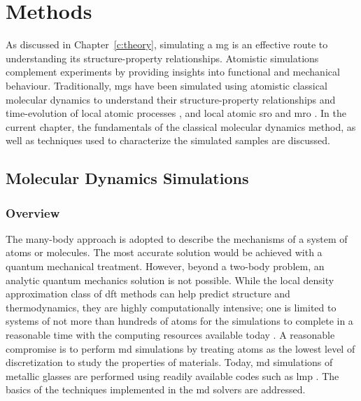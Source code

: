 \chapter{Methods} \label{c:methods}
As discussed in Chapter~\ref{c:theory}, simulating a \gls{mg} is an effective route to understanding its structure-property relationships. Atomistic simulations complement experiments by providing insights into functional and mechanical behaviour. Traditionally, \gls{mg}s have been simulated using atomistic classical molecular dynamics to understand their structure-property relationships and time-evolution of local atomic processes \cite{Schuh2007,Cheng2008}, and local atomic \gls{sro} and \gls{mro} \cite{Sheng2006}. In the current chapter, the fundamentals of the classical molecular dynamics method, as well as techniques used to characterize the simulated samples are discussed. \par

\section{Molecular Dynamics Simulations} \label{s:md}
\subsection{Overview}
The many-body approach is adopted to describe the mechanisms of a system of atoms or molecules. The most accurate solution would be achieved with a quantum mechanical treatment. However, beyond a two-body problem, an analytic quantum mechanics solution is not possible. While the local density approximation class of \gls{dft} methods can help predict structure and thermodynamics, they are highly computationally intensive; one is limited to systems of not more than hundreds of atoms for the simulations to complete in a reasonable time with the computing resources available today \cite{Burke2012}. A reasonable compromise is to perform \gls{md} simulations by treating atoms as the lowest level of discretization to study the properties of materials. Today, \gls{md} simulations of metallic glasses are performed using readily available codes such as \gls{lmp} \cite{Plimpton1995,Thompson2022}. The basics of the techniques implemented in the \gls{md} solvers are addressed.  \par 

